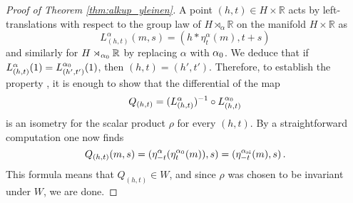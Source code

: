 \documentclass[a4paper,12pt]{amsart}
\theoremstyle{plain}
\theoremstyle{definition}
\theoremstyle{plain}
\theoremstyle{remark}
\begin{document}
\begin{proof}[Proof of Theorem \ref{thm:alkup_yleinen}]
	A point \( (h,t) \in H \times \mathbb{R} \) acts by left-translations with respect to the group law of \( H \rtimes_\alpha \mathbb{R} \) on the manifold \( H \times \mathbb{R}\) as
	\begin{equation} \label{eq:tulon_maar1}
	L^\alpha_{(h,t)}(m,s) = (h * \eta_t^\alpha(m),t+s)
	\end{equation}
	and similarly for \( H \rtimes_{{\alpha_0}} \mathbb{R} \) by replacing \( \alpha \) with \( {\alpha_0} \). We deduce that if \( L_{(h,t)}^{\alpha}(1) = L_{(h',t')}^{{\alpha_0}}(1) \), then \( (h,t) = (h',t') \).
	Therefore, to establish the property \propJ, it is enough to show that the differential of the map
	\begin{equation*}
	Q_{(h,t)} = (L_{(h,t)}^{\alpha})^{-1} \circ L_{(h,t)}^{\aaa} %
	\end{equation*}
	is an isometry for the scalar product \( \rho \) for every \( (h,t) \).
	By a straightforward computation one now finds
	\begin{equation*}
	Q_{(h,t)}(m,s) 
	= (\eta^{\alpha}_{-t}(\eta^{{\alpha_0}}_{t}(m)),s)  = 
	(\eta^{\alpha_\mathrm{si}}_{-t}(m),s) \,.
	\end{equation*}
	This formula means that \( Q_{(h,t)} \in W \), and since \( \rho \) was chosen to be invariant under \( W \), we are done.
\end{proof}
\end{document}
